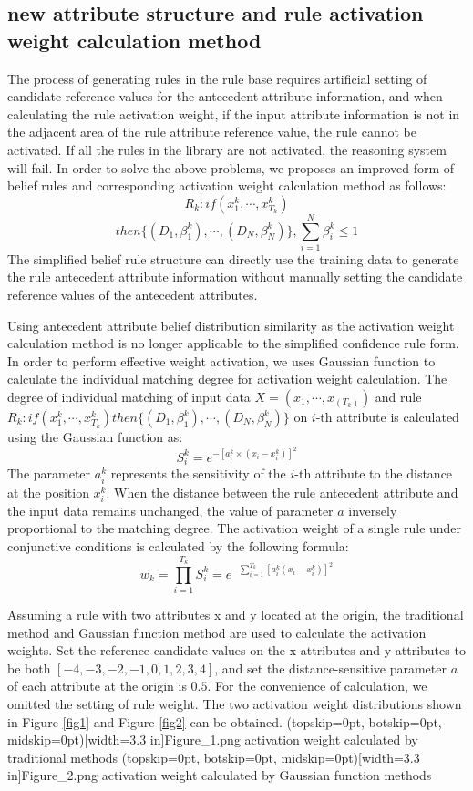 \documentclass{ieeeaccess}
\begin{document}
\subsection{new attribute structure and rule activation weight calculation method}
The process of generating rules in the rule base requires artificial setting of candidate reference values for the antecedent attribute information,
and when calculating the rule activation weight, if the input attribute information is not in the adjacent area of the rule attribute reference value, the rule cannot be activated.
If all the rules in the library are not activated, the reasoning system will fail. In order to solve the above problems, we proposes an improved form of belief rules and corresponding activation weight calculation method as follows:
$$R_k:if(x_1^k , \cdots , x_{T_k}^k)$$
$$then\{(D_1,\beta_1^k),\cdots,(D_N,\beta_N^k)\},\sum_{i=1}^N\beta_i^k\leq1$$
The simplified belief rule structure can directly use the training data to generate the rule antecedent attribute information without manually setting the candidate reference values of the antecedent attributes.

Using antecedent attribute belief distribution similarity as the activation weight calculation method is no longer applicable to the simplified confidence rule form. In order to perform effective weight activation,
we uses Gaussian function to calculate the individual matching degree for activation weight calculation.
The degree of individual matching of input data $X=(x_1,\cdots,x_(T_k))$ and rule $R_k:if(x_1^k , \cdots , x_{T_k}^k)then\{(D_1,\beta_1^k),\cdots,(D_N,\beta_N^k)\}$ on $i$-th attribute is calculated using the Gaussian function as:
$$S_i^k=e^{-[a_i^k\times(x_i-x_i^k)]^2}$$
The parameter $a_i^k$ represents the sensitivity of the $i$-th attribute to the distance at the position $x_i^k$. When the distance between the rule antecedent attribute and the input data remains unchanged,
the value of parameter $a$ inversely proportional to the matching degree.
The activation weight of a single rule under conjunctive conditions is calculated by the following formula:
$$w_k=\prod_{i=1}^{T_k}S_i^k=e^{-\sum_{i=1}^{T_k}[a_i^k(x_i-x_i^k)]^2}$$


Assuming a rule with two attributes x and y located at the origin, the traditional method and Gaussian function method are used to calculate the activation weights.
Set the reference candidate values on the x-attributes and y-attributes to be both $[-4,-3,-2,-1,0,1,2,3,4]$,
and set the distance-sensitive parameter $a$ of each attribute at the origin is $0.5$.
For the convenience of calculation, we omitted the setting of rule weight.
The two activation weight distributions shown in Figure \ref{fig1} and Figure \ref{fig2} can be obtained.
\Figure[!t](topskip=0pt, botskip=0pt, midskip=0pt)[width=3.3 in]{Figure_1.png}
{activation weight calculated by traditional methods\label{fig1}}
\Figure[!t](topskip=0pt, botskip=0pt, midskip=0pt)[width=3.3 in]{Figure_2.png}
{activation weight calculated by Gaussian function methods\label{fig2}}
\end{document}
